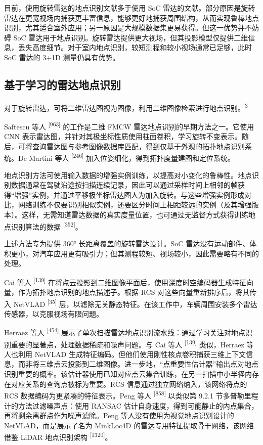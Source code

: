 目前，使用旋转雷达的地点识别文献多于使用 SoC 雷达的文献。部分原因是旋转雷达在更宽视场内捕获更丰富信息，能够更好地捕获周围结构，从而实现鲁棒地点识别，尤其适合室外应用；另一原因是大规模数据集更易获得。但这一优势并不妨碍 SoC 雷达用于地点识别。旋转雷达提供更大视场，但其投影模型仅提供二维信息，丢失高度细节。对于室内地点识别，较短测程和较小视场通常已足够，此时 SoC 雷达的 3+1D 测量仍具有优势。

\subsection{基于学习的雷达地点识别}

对于旋转雷达，可将二维雷达图视为图像，利用二维图像检索进行地点识别。\textsuperscript{3}

Saftescu 等人 \textsuperscript{[963]} 的工作是二维 FMCW 雷达地点识别的早期方法之一。它使用 CNN 表示雷达图，并针对其极坐标性质使用柱面卷积，学习旋转不变表示。随后，可将查询雷达图与参考图像数据库匹配，得到仅基于外观的拓扑地点识别系统。De Martini 等人 \textsuperscript{[246]} 加入位姿细化，得到拓扑度量建图和定位系统。

地点识别方法可使用输入数据的增强实例训练，以提高对小变化的鲁棒性。地点识别数据通常在驾驶沿途按扫描连续记录，因此可以通过采样时间上相邻的帧获得“增强”实例，并通过平移极坐标雷达图人为加入旋转。与这些增强实例形成对比，网络训练不仅要识别相似实例，还要区分时间上相距较远的实例（及其增强版本）。这样，无需知道雷达数据的真实度量位置，也可通过无监督方式获得训练地点识别算法的数据 \textsuperscript{[352]}。

上述方法专为提供 360° 长距离覆盖的旋转雷达设计。SoC 雷达没有运动部件、体积更小，对汽车应用更有吸引力；但其测程较短、视场较小，因此需要略有不同的处理。

Cai 等人 \textsuperscript{[139]} 在将点云投影到二维图像平面后，使用深度时空编码器生成特征向量，作为拓扑地点识别的地点描述子。根据 RCS 对这些向量重新排序后，将其传入 NetVLAD \textsuperscript{[35]} 层，以滤除无关静态特征。在该工作中，车辆周围安装多个雷达传感器，以克服视场有限问题。

Herraez 等人 \textsuperscript{[454]} 展示了单次扫描雷达地点识别流水线：通过学习关注对地点识别重要的显著点，处理数据稀疏和噪声问题。与 Cai 等人 \textsuperscript{[139]} 类似，Herraez 等人也利用 NetVLAD 生成特征编码。但他们使用刚性核点卷积捕获三维上下文信息，而非将三维点云投影到二维图像。进一步地，“点重要性估计器”输出点对地点识别重要的概率。该估计器使用已知对应点云集合训练，在另一扫描中小半径内存在对应关系的查询点被标为重要。RCS 信息通过独立网络纳入，该网络将点的 RCS 数据编码为更紧凑的特征表示。Peng 等人 \textsuperscript{[858]} 以类似第 9.2.1 节多普勒里程计的方法过滤噪声点：使用 RANSAC 估计自身速度，得到可能静止的内点集合，再将剩余离群点作为噪声滤除。Peng 等人没有使用为视觉地点识别设计的 NetVLAD，而是展示了名为 MinkLoc4D 的雷达专用特征提取骨干网络，该网络借鉴 LiDAR 地点识别架构 \textsuperscript{[1320]}。

